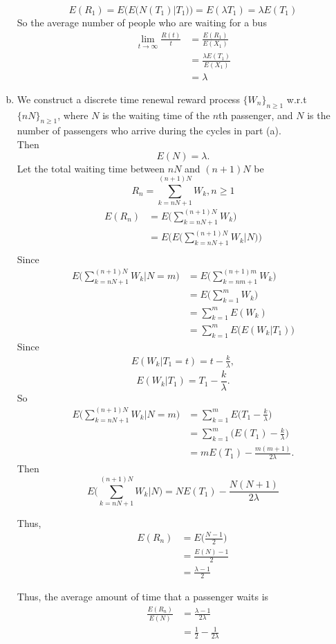 \documentclass{amsart}
\theoremstyle{plain}
\theoremstyle{definition}
\begin{document}
\begin{enumerate}[(a)]
	\[E(R_1) = E\Big(E\big(N(T_1)|T_1\big)\Big) = E(\lambda T_1) = \lambda E(T_1)  \]	
	So the average number of people who are waiting for a bus
	\begin{align*}
		\lim_{t\to \infty} \frac{R(t)}{t} &= \frac{E(R_1)}{E(X_1)}\\
					 		  	   	  	  &= \frac{\lambda E(T_1)}{E(X_1)}\\
									  	  & = \lambda
	\end{align*}
	\item
		We construct a discrete time renewal reward process $\{W_n\}_{n\geq 1}$ w.r.t $\{nN\}_{n\geq 1}$, where $N$ is the waiting time of the $n$th passenger, and $N$ is the number of passengers who arrive during the cycles in part (a).\\
		Then 
		\[E(N) = \lambda.\]
	Let the total waiting time between $nN$ and $(n+1)N$ be
	\[ R_n = \sum_{k=nN+1}^{(n+1)N}W_k, n\geq 1 \]
	\begin{align*}
		E(R_n) &= E\Bigg(\sum_{k=nN+1}^{(n+1)N}W_k \Bigg) \\
		       &= E\Bigg(E\Bigg(\sum_{k=nN+1}^{(n+1)N}W_k | N \Bigg)\Bigg) \\
	\end{align*}
	Since 
	\begin{align*}
		E\Bigg(\sum_{k=nN+1}^{(n+1)N}W_k | N = m \Bigg) &= E\Bigg(\sum_{k=nm+1}^{(n+1)m}W_k\Bigg)\\
														&= E\Bigg(\sum_{k=1}^{m}W_k\Bigg)\\
														&= \sum_{k=1}^{m}E(W_k) \\
														&=\sum_{k=1}^{m}E\big(E(W_k|T_1)\big)
	\end{align*}
	Since 
	\begin{align*}
		E(W_k|T_1= t) = t - \frac{k}{\lambda}, 
	\end{align*}
	\[E(W_k|T_1) = T_1- \frac{k}{\lambda}.\]
	So  
	\begin{align*}
		E\Bigg(\sum_{k=nN+1}^{(n+1)N}W_k | N = m \Bigg) &= \sum_{k=1}^{m} E\Big(T_1- \frac{k}{\lambda}\Big)\\
														&= \sum_{k=1}^{m} \Big(E(T_1)- \frac{k}{\lambda}\Big)\\
														&= mE(T_1) - \frac{m(m+1)}{2\lambda}.
	\end{align*}
	Then 
	\[ E\Bigg(\sum_{k=nN+1}^{(n+1)N}W_k | N \Bigg) = NE(T_1) - \frac{N(N+1)}{2\lambda}  \]

	Thus, 
	\begin{align*}
		E(R_n) &= E\Big(\frac{N-1}{2}\Big)\\
			   &= \frac{E(N)-1}{2} \\
			   &= \frac{\lambda-1}{2}
	\end{align*}

	Thus, the average amount of time that a passenger waits is 
	\begin{align*}
		\frac{E(R_n)}{E(N)} &= \frac{\lambda-1}{2\lambda}\\
							&= \frac{1}{2} - \frac{1}{2\lambda}
	\end{align*}

\end{enumerate}	
\end{document}
